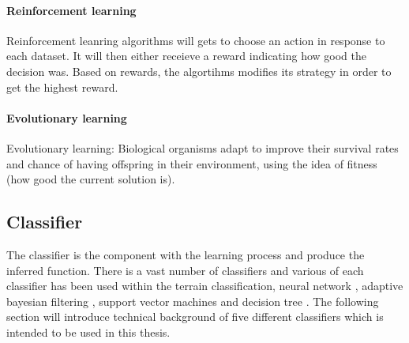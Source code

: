 \documentclass[USenglish]{ifimaster}  %
\begin{document}
\paragraph{Reinforcement learning}
Reinforcement leanring algorithms will gets to choose an action in response to each dataset. It will then either receieve a reward indicating how good the decision was. Based on rewards, the algortihms modifies its strategy in order to get the highest reward.

\paragraph{Evolutionary learning}
Evolutionary learning: Biological organisms adapt
to improve their survival rates and chance of having
offspring in their environment, using the idea of
fitness (how good the current solution is).



\subsection{Classifier}
The classifier is the component with the learning process and produce the inferred function. There is a vast number of classifiers and various of each classifier has been used within the terrain classification, neural network \cite{6784609,5752869,4654717}, adaptive bayesian filtering \cite{5152327,6849778}, support vector machines \cite{5602459,4161556,4059113} and decision tree \cite{6849778}. The following section will introduce technical background of five different classifiers which is intended to be used in this thesis.
\end{document}
